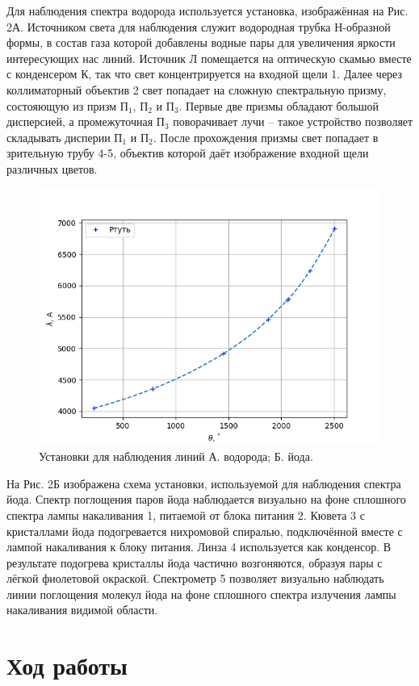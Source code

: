 \documentclass[a4paper, 12pt]{article}%
\begin{document}
Для наблюдения спектра водорода используется установка, изображённая на Рис. 2А. Источником света для наблюдения служит водородная трубка Н-образной формы, в состав газа которой добавлены водные пары для увеличения яркости интересующих нас линий. Источник Л помещается на оптическую скамью вместе с конденсером К, так что свет концентрируется на входной щели 1. Далее через коллиматорный объектив 2 свет попадает на сложную спектральную призму, состояющую из призм П$_1$, П$_2$ и П$_3$. Первые две призмы обладают большой дисперсией, а промежуточная П$_3$ поворачивает лучи -- такое устройство позволяет складывать дисперии П$_1$ и П$_2$. После прохождения призмы свет попадает в зрительную трубу 4-5, объектив которой даёт изображение входной щели различных цветов.
\newpage
\begin{figure}[h]
\includegraphics[scale=0.5]{2.png}
\centering
\caption{Установки для наблюдения линий А. водорода; Б. йода.}
\end{figure} 
На Рис. 2Б изображена схема установки, используемой для наблюдения спектра йода. Спектр поглощения паров йода наблюдается визуально на фоне сплошного спектра лампы накаливания 1, питаемой от блока питания 2. Кювета 3 с кристаллами йода подогревается нихромовой спиралью, подключённой вместе с лампой накаливания к блоку питания. Линза 4 используется как конденсор. В результате подогрева кристаллы йода частично возгоняются, образуя пары
с лёгкой фиолетовой окраской. Спектрометр 5 позволяет визуально наблюдать линии поглощения молекул йода на фоне сплошного спектра излучения лампы накаливания видимой области.

\section{Ход работы}
\end{document}
